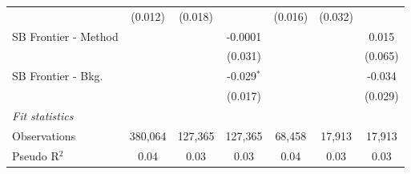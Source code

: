 \begin{tabular}{lcccccc}
                        & (0.012) & (0.018) &              & (0.016) & (0.032) &   \\   
   SB Frontier - Method &         &         & -0.0001      &         &         & 0.015\\   
                        &         &         & (0.031)      &         &         & (0.065)\\   
   SB Frontier - Bkg.   &         &         & -0.029$^{*}$ &         &         & -0.034\\   
                        &         &         & (0.017)      &         &         & (0.029)\\   
   \midrule
   \emph{Fit statistics}\\
   Observations         & 380,064 & 127,365 & 127,365      & 68,458  & 17,913  & 17,913\\  
   Pseudo R$^2$         & 0.04    & 0.03    & 0.03         & 0.04    & 0.03    & 0.03\\  
   

\end{tabular}
